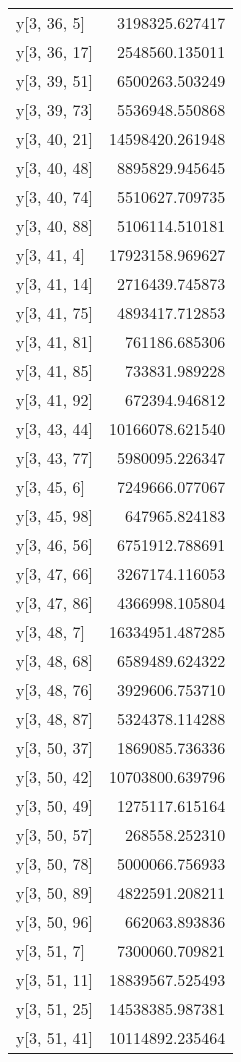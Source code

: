 \begin{longtable}{lr}
y[3, 36, 5] & 3198325.627417 \\
y[3, 36, 17] & 2548560.135011 \\
y[3, 39, 51] & 6500263.503249 \\
y[3, 39, 73] & 5536948.550868 \\
y[3, 40, 21] & 14598420.261948 \\
y[3, 40, 48] & 8895829.945645 \\
y[3, 40, 74] & 5510627.709735 \\
y[3, 40, 88] & 5106114.510181 \\
y[3, 41, 4] & 17923158.969627 \\
y[3, 41, 14] & 2716439.745873 \\
y[3, 41, 75] & 4893417.712853 \\
y[3, 41, 81] & 761186.685306 \\
y[3, 41, 85] & 733831.989228 \\
y[3, 41, 92] & 672394.946812 \\
y[3, 43, 44] & 10166078.621540 \\
y[3, 43, 77] & 5980095.226347 \\
y[3, 45, 6] & 7249666.077067 \\
y[3, 45, 98] & 647965.824183 \\
y[3, 46, 56] & 6751912.788691 \\
y[3, 47, 66] & 3267174.116053 \\
y[3, 47, 86] & 4366998.105804 \\
y[3, 48, 7] & 16334951.487285 \\
y[3, 48, 68] & 6589489.624322 \\
y[3, 48, 76] & 3929606.753710 \\
y[3, 48, 87] & 5324378.114288 \\
y[3, 50, 37] & 1869085.736336 \\
y[3, 50, 42] & 10703800.639796 \\
y[3, 50, 49] & 1275117.615164 \\
y[3, 50, 57] & 268558.252310 \\
y[3, 50, 78] & 5000066.756933 \\
y[3, 50, 89] & 4822591.208211 \\
y[3, 50, 96] & 662063.893836 \\
y[3, 51, 7] & 7300060.709821 \\
y[3, 51, 11] & 18839567.525493 \\
y[3, 51, 25] & 14538385.987381 \\
y[3, 51, 41] & 10114892.235464 \\

\end{longtable}

